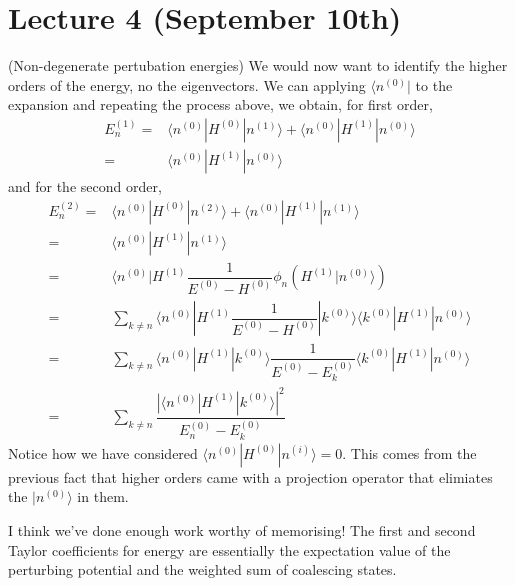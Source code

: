\section{Lecture 4 (September 10th)}
\begin{defi}
(Non-degenerate pertubation energies) We would now want to identify the higher orders of the energy, no the eigenvectors. We can applying $\langle n^{(0)}|$ to the expansion and repeating the process above, we obtain, for first order,
\[\begin{align*}
E_{n}^{(1)}=&\langle n^{(0)}|H^{(0)}|n^{(1)}\rangle +\langle n^{(0)}|H^{(1)}|n^{(0)}\rangle \\
=&\langle n^{(0)}|H^{(1)}|n^{(0)}\rangle 
\end{align*}\]
and for the second order,
\[\begin{align*}
E^{(2)}_{n}=&\langle n^{(0)}|H^{(0)}|n^{(2)}\rangle +\langle n^{(0)}|H^{(1)}|n^{(1)}\rangle \\
=&\langle n^{(0)}|H^{(1)}|n^{(1)}\rangle \\
=&\langle n^{(0)}|H^{(1)}\dfrac{1}{E^{(0)}-H^{(0)}}\phi _{n}(H^{(1)}|n^{(0)}\rangle )\\
=&\sum _{k\ne n}\langle n^{(0)}|H^{(1)}\dfrac{1}{E^{(0)}-H^{(0)}}|k^{(0)}\rangle \langle k^{(0)}|H^{(1)}|n^{(0)}\rangle \\
=&\sum _{k\ne n}\langle n^{(0)}|H^{(1)}|k^{(0)}\rangle \dfrac{1}{E^{(0)}-E_{k}^{(0)}}\langle k^{(0)}|H^{(1)}|n^{(0)}\rangle \\
=&\sum _{k\ne n}\dfrac{|\langle n^{(0)}|H^{(1)}|k^{(0)}\rangle|^2 }{E^{(0)}_{n}-E_{k}^{(0)}}
\end{align*}\]
Notice how we have considered $\langle n^{(0)}|H^{(0)}|n^{(i)}\rangle =0$. This comes from the previous fact that higher orders came with a projection operator that elimiates the $|n^{(0)}\rangle $ in them. 

\bigskip

I think we've done enough work worthy of memorising! The first and second Taylor coefficients for energy are essentially the expectation value of the perturbing potential and the weighted sum of coalescing states.
\end{defi}
\vspace{2ex}


